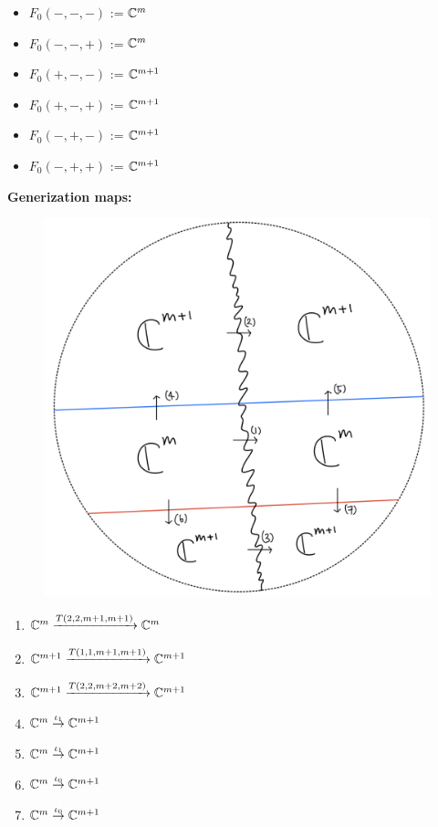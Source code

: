 \begin{itemize}
\item $F_0(-,-,-)$ := $\mathbb{C}^m$
\item $F_0(-,-,+)$ := $\mathbb{C}^m$
\item $F_0(+,-,-)$ := $\mathbb{C}^{m+1}$
\item $F_0(+,-,+)$ := $\mathbb{C}^{m+1}$
\item $F_0(-,+,-)$ := $\mathbb{C}^{m+1}$
\item $F_0(-,+,+)$ := $\mathbb{C}^{m+1}$
\end{itemize}

\textbf{Generization maps:}
\begin{figure}[H]
    \centering
    \includegraphics[scale = 0.95]{diagrams/lemma1/21.png} 
    \caption{}
    \label{fig:your-label}
\end{figure}

\begin{enumerate}[label = (\arabic*)]
\item $\mathbb{C}^m \xrightarrow{T(2,2,m+1,m+1)} \mathbb{C}^m$

\item $\mathbb{C}^{m+1} \xrightarrow{T(1,1,m+1,m+1)} \mathbb{C}^{m+1}$

\item $\mathbb{C}^{m+1} \xrightarrow{T(2,2,m+2,m+2)} \mathbb{C}^{m+1}$

\item $\mathbb{C}^{m} \overset{\iota_1}{\rightarrow} \mathbb{C}^{m+1}$

\item $\mathbb{C}^{m} \overset{\iota_1}{\rightarrow} \mathbb{C}^{m+1}$

\item $\mathbb{C}^{m} \overset{\iota_0}{\rightarrow} \mathbb{C}^{m+1}$

\item $\mathbb{C}^{m} \overset{\iota_0}{\rightarrow} \mathbb{C}^{m+1}$
\end{enumerate}

